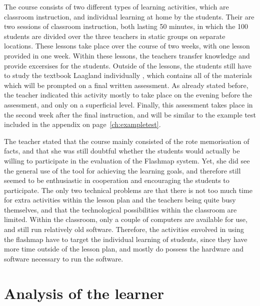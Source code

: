 The course consists of two different types of learning activities, which are classroom instruction, and individual learning at home by the students. Their are two sessions of classroom instruction, both lasting 50 minutes, in which the 100 students are divided over the three teachers in static groups on separate locations. These lessons take place over the course of two weeks, with one lesson provided in one week. Within these lessons, the teachers transfer knowledge and provide excersises for the students. Outside of the lessons, the students still have to study the textbook Laagland individually \cite{laagland}, which contains all of the materials which will be prompted on a final written assessment. As already stated before, the teacher indicated this activity mostly to take place on the evening before the assessment, and only on a superficial level. Finally, this assessment takes place in the second week after the final instruction, and will be similar to the example test included in the appendix on page~\ref{ch:exampletest}.

The teacher stated that the course mainly consisted of the rote memorisation of facts, and that she was still doubtful whether the students would actually be willing to participate in the evaluation of the Flashmap system. Yet, she did see the general use of the tool for achieving the learning goals, and therefore still seemed to be enthusiastic in cooperation and encouraging the students to participate. The only two technical problems are that there is not too much time for extra activities within the lesson plan and the teachers being quite busy themselves, and that the technological possibilities within the classroom are limited. Within the classroom, only a couple of computers are available for use, and still run relatively old software. Therefore, the activities envolved in using the flashmap have to target the individual learning of students, since they have more time outside of the lesson plan, and mostly do possess the hardware and software necessary to run the software.

\section{Analysis of the learner}


